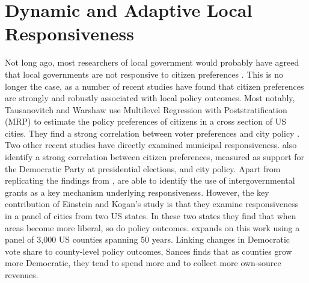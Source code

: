 \documentclass[a4paper,12pt]{article}
\begin{document}
\section*{Dynamic and Adaptive Local Responsiveness}

 Not long ago, most researchers of local government would probably have agreed that local governments are not responsive to citizen preferences \citep{peterson1981city}. This is no longer the case, as a number of recent studies have found that citizen preferences are strongly and robustly associated with local policy outcomes. Most notably, Tausanovitch and Warshaw use Multilevel Regression with Poststratification (MRP) to estimate the policy preferences of citizens in a cross section of US cities. They find a strong correlation between voter preferences and city policy \citep[for earlier efforts, see ][]{hajnal2010or,palus2010responsiveness}. Two other recent studies have directly examined municipal responsiveness. \cite{einstein2016pushing} also identify a strong correlation between citizen preferences, measured as support for the Democratic Party at presidential elections,  and city policy. Apart from replicating the findings from \citeauthor{tausanovitch2014representation}, \citeauthor{einstein2016pushing} are able to identify the use of intergovernmental grants as a key mechanism underlying responsiveness. However, the key contribution of Einstein and Kogan's study is that they examine responsiveness in a panel of cities from two US states. In these two states they find that when areas become more liberal, so do policy outcomes. \citet{sances2017voters} expands on this work using a panel of 3,000 US counties spanning 50 years. Linking changes in Democratic vote share to county-level policy outcomes, Sances finds that as counties grow more Democratic, they tend to spend more and to collect more own-source revenues.
 
\end{document}
